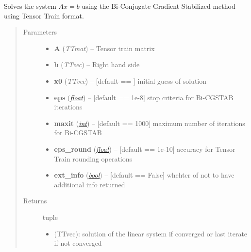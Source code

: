 \documentclass[a4paper,10pt,english]{sphinxmanual}
\begin{document}
\begin{fulllineitems}
\label{api-multilinalg:TensorToolbox.multilinalg.bicgstab}
Solves the system \(Ax=b\) using the Bi-Conjugate Gradient Stabilized method using Tensor Train format.
\begin{quote}\begin{description}
\item[{Parameters}] \leavevmode\begin{itemize}
\item {} 
\textbf{A} (\emph{TTmat}) -- Tensor train matrix

\item {} 
\textbf{b} (\emph{TTvec}) -- Right hand side

\item {} 
\textbf{x0} (\emph{TTvec}) -- {[}default == {\hyperref[api-core:TensorToolbox.core.zerosvec]{}}{]} initial guess of solution 

\item {} 
\textbf{eps} (\href{http://docs.python.org/library/functions.html\#float}{\emph{float}}) -- {[}default == 1e-8{]} stop criteria for Bi-CGSTAB iterations

\item {} 
\textbf{maxit} (\href{http://docs.python.org/library/functions.html\#int}{\emph{int}}) -- {[}default == 1000{]} maximum number of iterations for Bi-CGSTAB

\item {} 
\textbf{eps\_round} (\href{http://docs.python.org/library/functions.html\#float}{\emph{float}}) -- {[}default == 1e-10{]} accuracy for Tensor Train rounding operations

\item {} 
\textbf{ext\_info} (\href{http://docs.python.org/library/functions.html\#bool}{\emph{bool}}) -- {[}default == False{]} whehter of not to have additional info returned

\end{itemize}

\item[{Returns}] \leavevmode

tuple 
\begin{itemize}
\item {} 
 (TTvec): solution of the linear system if converged or last iterate if not converged


\end{itemize}
\end{description}
\end{quote}
\end{fulllineitems}
\end{document}
